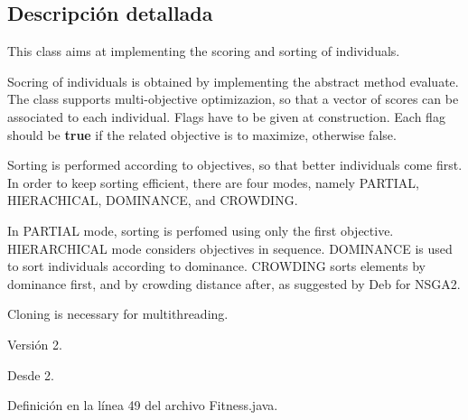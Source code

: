 \subsection{Descripción detallada}
This class aims at implementing the scoring and sorting of individuals. 

Socring of individuals is obtained by implementing the abstract method {\ttfamily evaluate}. The class supports multi-\/objective optimizazion, so that a vector of scores can be associated to each individual. Flags have to be given at construction. Each flag should be {\bfseries true} if the related objective is to maximize, otherwise false. 

Sorting is performed according to objectives, so that better individuals come first. In order to keep sorting efficient, there are four modes, namely {\ttfamily P\-A\-R\-T\-I\-A\-L}, {\ttfamily H\-I\-E\-R\-A\-C\-H\-I\-C\-A\-L}, {\ttfamily D\-O\-M\-I\-N\-A\-N\-C\-E}, and {\ttfamily C\-R\-O\-W\-D\-I\-N\-G}. 

In {\ttfamily P\-A\-R\-T\-I\-A\-L} mode, sorting is perfomed using only the first objective. {\ttfamily H\-I\-E\-R\-A\-R\-C\-H\-I\-C\-A\-L} mode considers objectives in sequence. {\ttfamily D\-O\-M\-I\-N\-A\-N\-C\-E} is used to sort individuals according to dominance. {\ttfamily C\-R\-O\-W\-D\-I\-N\-G} sorts elements by dominance first, and by crowding distance after, as suggested by Deb for N\-S\-G\-A2. 

Cloning is necessary for multithreading. 

\begin{DoxyVersion}{Versión}
2. 
\end{DoxyVersion}
\begin{DoxySince}{Desde}
2. 
\end{DoxySince}


Definición en la línea 49 del archivo Fitness.\-java.



